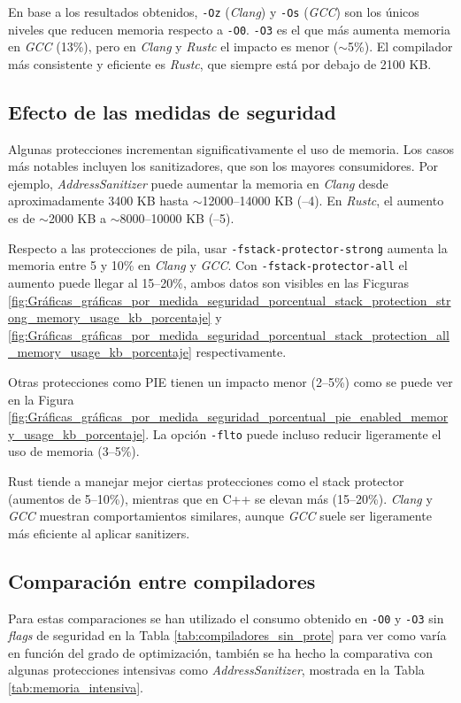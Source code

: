 En base a los resultados obtenidos, \texttt{-Oz} (\emph{Clang}) y \texttt{-Os} (\emph{GCC}) son los únicos niveles que reducen memoria respecto a \texttt{-O0}. \texttt{-O3} es el que más aumenta memoria en \emph{GCC} (13\%), pero en \emph{Clang} y \emph{Rustc} el impacto es menor ($\sim$5\%). El compilador más consistente y eficiente es \emph{Rustc}, que siempre está por debajo de 2100 KB.

\subsection*{Efecto de las medidas de seguridad}

Algunas protecciones incrementan significativamente el uso de memoria. Los casos más notables incluyen los sanitizadores, que son los mayores consumidores. Por ejemplo, \emph{AddressSanitizer} puede aumentar la memoria en \emph{Clang} desde aproximadamente 3400 KB hasta $\sim$12000--14000 KB (--4). En \emph{Rustc}, el aumento es de $\sim$2000 KB a $\sim$8000--10000 KB (--5).

Respecto a las protecciones de pila, usar \texttt{-fstack-protector-strong} aumenta la memoria entre 5 y 10\% en \emph{Clang} y \emph{GCC}. Con \texttt{-fstack-protector-all} el aumento puede llegar al 15--20\%, ambos datos son visibles en las Ficguras \ref{fig:Gráficas_gráficas_por_medida_seguridad_porcentual_stack_protection_strong_memory_usage_kb_porcentaje} y \ref{fig:Gráficas_gráficas_por_medida_seguridad_porcentual_stack_protection_all_memory_usage_kb_porcentaje} respectivamente.

Otras protecciones como PIE tienen un impacto menor (2--5\%) como se puede ver en la Figura \ref{fig:Gráficas_gráficas_por_medida_seguridad_porcentual_pie_enabled_memory_usage_kb_porcentaje}. La opción \texttt{-flto} puede incluso reducir ligeramente el uso de memoria (3--5\%).

Rust tiende a manejar mejor ciertas protecciones como el stack protector (aumentos de 5--10\%), mientras que en C++ se elevan más (15--20\%). \emph{Clang} y \emph{GCC} muestran comportamientos similares, aunque \emph{GCC} suele ser ligeramente más eficiente al aplicar sanitizers.

\subsection*{Comparación entre compiladores}

Para estas comparaciones se han utilizado el consumo obtenido en \texttt{-O0} y \texttt{-O3} sin \emph{flags} de seguridad en la Tabla \ref{tab:compiladores_sin_prote} para ver como varía en función del grado de optimización, también se ha hecho la comparativa con algunas protecciones intensivas como \emph{AddressSanitizer}, mostrada en la Tabla \ref{tab:memoria_intensiva}.

